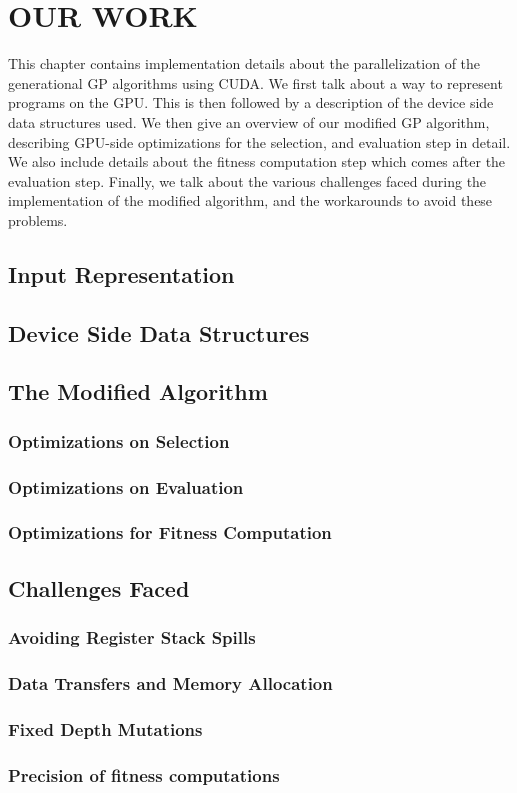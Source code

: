 \chapter{OUR WORK}
\label{chap:ourwork}
This chapter contains implementation details about the parallelization of the generational GP algorithms using CUDA. We first talk about a way to represent programs on the GPU. This is then followed by a description of the device side data structures used. We then give an overview of our modified GP algorithm, describing GPU-side optimizations for the selection, and evaluation step in detail. We also include details about the fitness computation step which comes after the evaluation step. Finally, we talk about the various challenges faced during the implementation of the modified algorithm, and the workarounds to avoid these problems.

\section{Input Representation}
\section{Device Side Data Structures}
\section{The Modified Algorithm}

\subsection{Optimizations on Selection}
\subsection{Optimizations on Evaluation}
\subsection{Optimizations for Fitness Computation}

\section{Challenges Faced}
\subsection{Avoiding Register Stack Spills}
\subsection{Data Transfers and Memory Allocation}
\subsection{Fixed Depth Mutations}
\subsection{Precision of fitness computations}




